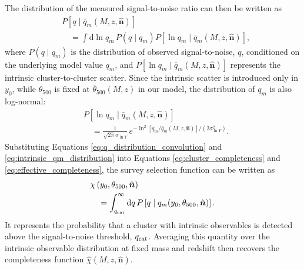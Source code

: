 \documentclass[aps,prd,twocolumn,superscriptaddress,nofootinbib,floatfix]{revtex4-2}
\begin{document}
The distribution of the measured signal-to-noise ratio can then be written as
\begin{equation}
\begin{aligned}
&P\left[
q\mid \bar q_m(M,z,\hat{\bm n})
\right]
\\
&\quad =
\int \mathrm{d}\ln q_m\,
P\left(q\mid q_m\right)
P\left[
\ln q_m
\mid
\bar q_m(M,z,\hat{\bm n})
\right],
\end{aligned}
\label{eq:q_distribution_convolution}
\end{equation}
where $P\left(q\mid q_m\right)$ is the distribution of observed signal-to-noise, $q$, conditioned on the underlying model value $q_m$, and $P\left[\ln q_m\mid\bar q_m(M,z,\hat{\bm n})
\right]$ represents the intrinsic cluster-to-cluster scatter. Since the intrinsic scatter is introduced only in $y_0$, while
$\theta_{500}$ is fixed at $\bar{\theta}_{500}(M,z)$ in our model, the distribution
of $q_m$ is also log-normal:
\begin{equation}
\begin{aligned}
&P\left[
\ln q_m
\mid
\bar q_m(M,z,\hat{\bm n})
\right]
\\
&\quad =
\frac{1}{\sqrt{2\pi}\sigma_{\ln Y}}\,
e^{
-\ln^2\left[
q_m/\bar q_m(M,z,\hat{\bm n})
\right]/
\left(2\sigma_{\ln Y}^{2}\right)
}.
\end{aligned}
\label{eq:intrinsic_qm_distribution}
\end{equation}
Substituting Equations \ref{eq:q_distribution_convolution} and \ref{eq:intrinsic_qm_distribution} into Equations \ref{eq:cluster_completeness} and \ref{eq:effective_completeness}, the survey selection function can be written as
\begin{equation}
\begin{aligned}
&\chi\left(
y_0,\theta_{500},\hat{\bm n}
\right)
\\
&\quad =
\int_{q_{\rm cat}}^{\infty}
\mathrm{d}q\,
P\left[
q\mid
q_m(y_0,\theta_{500},\hat{\bm n})
\right].
\end{aligned}
\label{eq:survey_selection_observables}
\end{equation}
It represents the probability that a cluster with intrinsic observables is detected above the signal-to-noise threshold, $q_{\rm cat}$. Averaging this quantity over the intrinsic observable distribution at fixed mass and redshift then recovers the completeness function $\hat{\chi}(M,z,\hat{\bm n})$.
\end{document}
